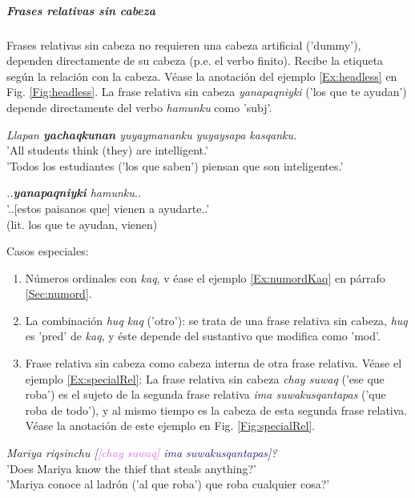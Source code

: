 \documentclass[a4paper,11pt,DIV12]{scrartcl}
\begin{document}
\subparagraph{Frases relativas sin cabeza}

Frases relativas sin cabeza no requieren una cabeza artificial ('dummy'), dependen directamente de su cabeza (p.e. el verbo finito). Recibe la etiqueta seg\'un la relaci\'on con la cabeza.
V\'ease la anotaci\'on del ejemplo \ref{Ex:headless} en Fig. \ref{Fig:headless}. La frase relativa sin cabeza {\em yanapaqniyki} ('los que te ayudan') depende directamente del verbo {\em hamunku} como 'subj'.

\begin{examples}
 \item {\em Llapan \textbf{yachaqkunan} yuyaymananku yuyaysapa kasqanku.}\\
	'All students think (they) are intelligent.'\\
	 'Todos los estudiantes ('los que saben') piensan que son inteligentes.'\\
	  	\hfill{\small \citep[25]{Sanchez2010}}
 \item\label{Ex:headless} {\em ..\textbf{yanapaqniyki} hamunku..} \\
      '..[estos paisanos que] vienen a ayudarte..'\\
      (lit. los que te ayudan, vienen)\\
       	\hfill{\small \citep{Valderrama77}}
\end{examples}

Casos especiales:

\begin{enumerate}
 \item  N\'umeros ordinales con {\em kaq}, v \'ease el ejemplo \ref{Ex:numordKaq} en p\'arrafo \ref{Sec:numord}.
  \item  La combinaci\'on {\em huq kaq} ('otro'): se trata de una frase relativa sin cabeza, {\em huq} es 'pred' de {\em kaq}, y \'este depende del sustantivo que modifica como 'mod'.
 \item  Frase relativa sin cabeza como cabeza interna de otra frase relativa. V\'ease el ejemplo \ref{Ex:specialRel}: La frase relativa sin cabeza {\em chay suwaq} ('ese que roba') es el sujeto de la segunda frase relativa {\em ima suwakusqantapas} ('que roba de todo'), y al mismo tiempo es la cabeza de esta segunda frase relativa. V\'ease la anotaci\'on de este ejemplo en Fig. \ref{Fig:specialRel}.
\end{enumerate}

\begin{examples}
 \item\label{Ex:specialRel} {\em Mariya riqsinchu \textcolor{MidnightBlue}{[}\textcolor{Orchid}{[chay suwaq]} \textcolor{MidnightBlue}{ima suwakusqantapas]}?}\\
      'Does Mariya know the thief that steals anything?'\\
      '{\textquestiondown}Mariya conoce al ladr\'on ('al que roba') que roba cualquier cosa?'
\end{examples}
\end{document}
